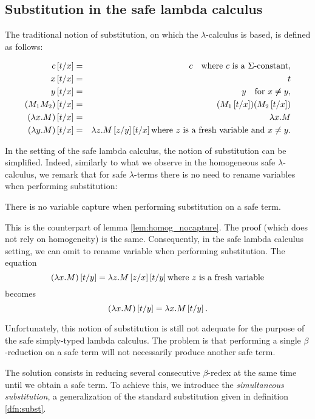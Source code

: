 \subsection{Substitution in the safe lambda calculus}

The traditional notion of substitution, on which the
$\lambda$-calculus is based, is defined as follows:
\begin{dfn}[Substitution]
\label{dfn:subst}
\begin{eqnarray*}
c \left[ t/x \right] &=& c \quad \mbox{where $c$ is a $\Sigma$-constant},\\
x \left[ t/x \right] &=& t\\
 y\left[ t/x \right] &=& y \quad \mbox{for } x \not \neq y,\\
(M_1 M_2) \left[ t/x \right] &=& (M_1 \left[ t/x \right]) (M_2 \left[ t/x \right])\\
(\lambda x . M) \left[ t/x \right] &=& \lambda x . M\\
(\lambda y . M) \left[ t/x \right] &=& \lambda z . M \left[ z/y \right]
\left[ t/x \right] \mbox{where $z$ is a fresh variable and $x\not = y$}.
\end{eqnarray*}
\end{dfn}

In the setting of the safe lambda calculus, the notion of
substitution can be simplified. Indeed, similarly to what we observe
in the homogeneous safe $\lambda$-calculus, we remark that for safe
$\lambda$-terms there is no need to rename variables when performing
substitution:

\begin{lem}
\label{lem:noclash} There is no variable capture when performing
substitution on a safe term.
\end{lem}

This is the counterpart of lemma \ref{lem:homog_nocapture}. The
proof (which does not rely on homogeneity) is the same.
Consequently, in the safe lambda calculus setting, we can omit to
rename variable when performing substitution. The equation
$$(\lambda x . M) \left[ t/y \right] = \lambda z . M \left[ z/x \right]
\left[ t/y \right] \mbox{where $z$ is a fresh variable}$$ becomes
$$(\lambda x . M) \left[ t/y \right] = \lambda x . M \left[ t/y \right].$$

Unfortunately, this notion of substitution is still not adequate for
the purpose of the safe simply-typed lambda calculus. The problem is
that performing a single $\beta$-reduction on a safe term will not
necessarily produce another safe term.

The solution consists in reducing several consecutive $\beta$-redex
at the same time until we obtain a safe term. To achieve this, we
introduce the \emph{simultaneous substitution}, a generalization of
the standard substitution given in definition \ref{dfn:subst}.

